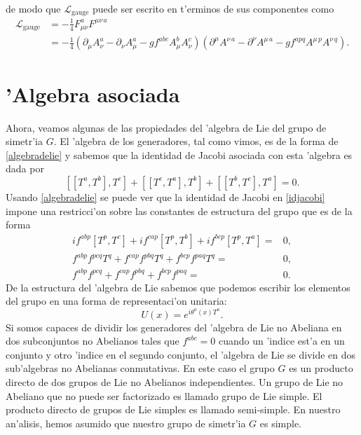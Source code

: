 de modo que $\mathcal{L}_{\text{gauge}}$ puede ser escrito en t'erminos de sus componentes como
\begin{equation}
\begin{aligned}
\mathcal{L}_{\text{gauge}}&=-\frac{1}{4}F^a_{\mu\nu}F^{\mu\nu\,a} \\
&=-\frac{1}{4}(\partial_\mu A_\nu ^a-\partial_\nu A_\mu ^a-gf^{abc}A_\mu ^b A^c_\nu)(\partial ^\mu A^{\nu\,a}-\partial^\nu A^{\mu\,a}-gf^{apq}A^{\mu\,p} A^{\nu\,q}).
\end{aligned}
\end{equation}
\section{'Algebra asociada}
Ahora, veamos algunas de las propiedades del 'algebra de Lie del grupo de simetr'ia $G$. El 'algebra de los generadores, tal como vimos, es de la forma de \eqref{algebradelie} y sabemos que la identidad de Jacobi asociada con esta 'algebra es dada por
\begin{equation}\label{idjacobi}
[[T^a,T^b],T^c]+[[T^c,T^a],T^b]+[[T^b,T^c],T^a]=0.
\end{equation}
Usando \eqref{algebradelie} se puede ver que la identidad de Jacobi en \eqref{idjacobi} impone una restricci'on sobre las constantes de estructura del grupo que es de la forma
\begin{equation}
\begin{aligned}
if^{abp}[T^p,T^c]+if^{cap}[T^p,T^b]+if^{bcp}[T^p,T^a]=&0, \\
f^{abp}f^{pcq}T^q+f^{cap}f^{pbq}T^q+f^{bcp}f^{paq}T^q=&0, \\
f^{abp}f^{pcq}+f^{cap}f^{pbq}+f^{bcp}f^{paq}=&0.
\end{aligned}
\end{equation}
De la estructura del 'algebra de Lie sabemos que podemos escribir los elementos del grupo en una forma de representaci'on unitaria:
\begin{equation}
U(x)=e^{i\theta^a(x)T^a}.
\end{equation}
Si somos capaces de dividir  los generadores del 'algebra de Lie no Abeliana en dos subconjuntos no Abelianos  tales que $f^{abc}=0$ cuando un 'indice est'a en un conjunto y otro 'indice en el segundo conjunto, el 'algebra de Lie se divide en dos sub'algebras no Abelianas conmutativas. En este caso el grupo $G$ es un producto directo de dos grupos de Lie no Abelianos independientes. Un grupo de Lie no Abeliano que no puede ser factorizado es llamado grupo de Lie simple. El producto directo de grupos de Lie simples es llamado semi-simple. En nuestro an'alisis, hemos asumido que nuestro grupo de simetr'ia $G$ es simple.
